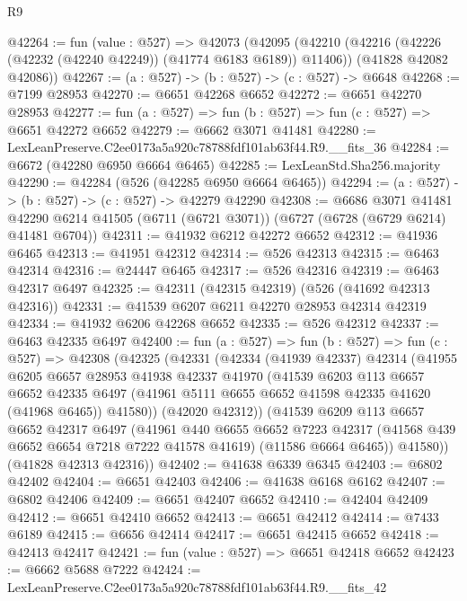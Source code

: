 \begin{lexlean}{R9}
\begin{coremodule}
@42264 := fun (value : @527) =>
  @42073
    (@42095
      (@42210 (@42216 (@42226 (@42232 (@42240 @42249)) (@41774 @6183 @6189)) @11406))
      (@41828 @42082 @42086))
@42267 := (a : @527) -> (b : @527) -> (c : @527) -> @6648
@42268 := @7199 @28953
@42270 := @6651 @42268 @6652
@42272 := @6651 @42270 @28953
@42277 := fun (a : @527) => fun (b : @527) => fun (c : @527) => @6651 @42272 @6652
@42279 := @6662 @3071 @41481
@42280 := LexLeanPreserve.C2ee0173a5a920c78788fdf101ab63f44.R9.__fits_36
@42284 := @6672 (@42280 @6950 @6664 @6465)
@42285 := LexLeanStd.Sha256.majority
@42290 := @42284 (@526 (@42285 @6950 @6664 @6465))
@42294 := (a : @527) -> (b : @527) -> (c : @527) -> @42279 @42290
@42308 := @6686
    @3071
    @41481
    @42290
    @6214
    @41505
    (@6711 (@6721 @3071))
    (@6727 (@6728 (@6729 @6214) @41481 @6704))
@42311 := @41932 @6212 @42272 @6652
@42312 := @41936 @6465
@42313 := @41951 @42312
@42314 := @526 @42313
@42315 := @6463 @42314
@42316 := @24447 @6465
@42317 := @526 @42316
@42319 := @6463 @42317 @6497
@42325 := @42311 (@42315 @42319) (@526 (@41692 @42313 @42316))
@42331 := @41539 @6207 @6211 @42270 @28953 @42314 @42319
@42334 := @41932 @6206 @42268 @6652
@42335 := @526 @42312
@42337 := @6463 @42335 @6497
@42400 := fun (a : @527) =>
  fun (b : @527) =>
  fun (c : @527) =>
  @42308
    (@42325
      (@42331
        (@42334
          (@41939 @42337)
          @42314
          (@41955
            @6205
            @6657
            @28953
            @41938
            @42337
            @41970
            (@41539
              @6203
              @113
              @6657
              @6652
              @42335
              @6497
              (@41961 @5111 @6655 @6652 @41598 @42335 @41620 (@41968 @6465))
              @41580))
          (@42020 @42312))
        (@41539
          @6209
          @113
          @6657
          @6652
          @42317
          @6497
          (@41961
            @440
            @6655
            @6652
            @7223
            @42317
            (@41568 @439 @6652 @6654 @7218 @7222 @41578 @41619)
            (@11586 @6664 @6465))
          @41580))
      (@41828 @42313 @42316))
@42402 := @41638 @6339 @6345
@42403 := @6802 @42402
@42404 := @6651 @42403
@42406 := @41638 @6168 @6162
@42407 := @6802 @42406
@42409 := @6651 @42407 @6652
@42410 := @42404 @42409
@42412 := @6651 @42410 @6652
@42413 := @6651 @42412
@42414 := @7433 @6189
@42415 := @6656 @42414
@42417 := @6651 @42415 @6652
@42418 := @42413 @42417
@42421 := fun (value : @527) => @6651 @42418 @6652
@42423 := @6662 @5688 @7222
@42424 := LexLeanPreserve.C2ee0173a5a920c78788fdf101ab63f44.R9.__fits_42

\end{coremodule}
\end{lexlean}
